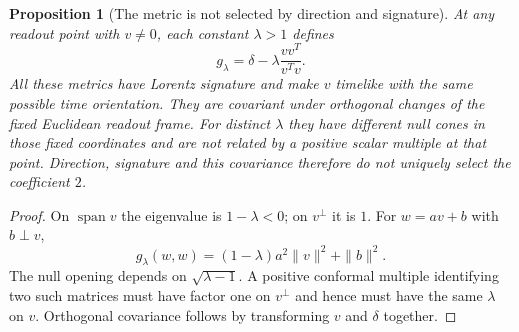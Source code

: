 \documentclass[11pt,letterpaper]{article}
\newtheorem{proposition}[theorem]{Proposition}
\theoremstyle{definition}
\numberwithin{equation}{section}
\begin{document}
\begin{proposition}[The metric is not selected by direction and signature]\label{metricnonunique}
At any readout point with $v\ne0$, each constant $\lambda>1$ defines
\begin{equation}
g_\lambda=\delta-\lambda\frac{vv^T}{v^Tv}.
\end{equation}
All these metrics have Lorentz signature and make $v$ timelike with the same possible time orientation. They are covariant under orthogonal changes of the fixed Euclidean readout frame. For distinct $\lambda$ they have different null cones in those fixed coordinates and are not related by a positive scalar multiple at that point. Direction, signature and this covariance therefore do not uniquely select the coefficient $2$.
\end{proposition}
\begin{proof}
On $\operatorname{span}v$ the eigenvalue is $1-\lambda<0$; on $v^\perp$ it is $1$. For $w=av+b$ with $b\perp v$,
\begin{equation}
g_\lambda(w,w)=(1-\lambda)a^2\|v\|^2+\|b\|^2.
\end{equation}
The null opening depends on $\sqrt{\lambda-1}$. A positive conformal multiple identifying two such matrices must have factor one on $v^\perp$ and hence must have the same $\lambda$ on $v$. Orthogonal covariance follows by transforming $v$ and $\delta$ together.
\end{proof}
\end{document}
